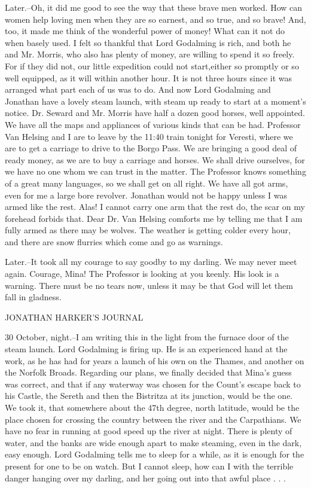 Later.--Oh, it did me good to see the way that these brave men worked. How can women help loving men when they are so earnest, and so true, and so brave! And, too, it made me think of the wonderful power of money! What can it not do when basely used. I felt so thankful that Lord Godalming is rich, and both he and Mr. Morris, who also has plenty of money, are willing to spend it so freely. For if they did not, our little expedition could not start,either so promptly or so well equipped, as it will within another hour. It is not three hours since it was arranged what part each of us was to do. And now Lord Godalming and Jonathan have a lovely steam launch, with steam up ready to start at a moment's notice. Dr. Seward and Mr. Morris have half a dozen good horses, well appointed. We have all the maps and appliances of various kinds that can be had. Professor Van Helsing and I are to leave by the 11:40 train tonight for Veresti, where we are to get a carriage to drive to the Borgo Pass. We are bringing a good deal of ready money, as we are to buy a carriage and horses. We shall drive ourselves, for we have no one whom we can trust in the matter. The Professor knows something of a great many languages, so we shall get on all right. We have all got arms, even for me a large bore revolver. Jonathan would not be happy unless I was armed like the rest. Alas! I cannot carry one arm that the rest do, the scar on my forehead forbids that. Dear Dr. Van Helsing comforts me by telling me that I am fully armed as there may be wolves. The weather is getting colder every hour, and there are snow flurries which come and go as warnings. 

Later.--It took all my courage to say goodby to my darling. We may never meet again. Courage, Mina! The Professor is looking at you keenly. His look is a warning. There must be no tears now, unless it may be that God will let them fall in gladness. 

JONATHAN HARKER'S JOURNAL 

30 October, night.--I am writing this in the light from the furnace door of the steam launch. Lord Godalming is firing up. He is an experienced hand at the work, as he has had for years a launch of his own on the Thames, and another on the Norfolk Broads. Regarding our plans, we finally decided that Mina's guess was correct, and that if any waterway was chosen for the Count's escape back to his Castle, the Sereth and then the Bistritza at its junction, would be the one. We took it, that somewhere about the 47th degree, north latitude, would be the place chosen for crossing the country between the river and the Carpathians. We have no fear in running at good speed up the river at night. There is plenty of water, and the banks are wide enough apart to make steaming, even in the dark, easy enough. Lord Godalming tells me to sleep for a while, as it is enough for the present for one to be on watch. But I cannot sleep, how can I with the terrible danger hanging over my darling, and her going out into that awful place . . . 

